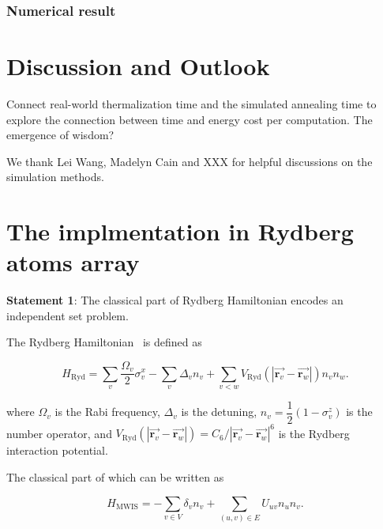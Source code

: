 \documentclass[twocolumn,superscriptaddress,english,showpacs,longbibliography]{revtex4-2}
\begin{document}
\subsubsection{Numerical result}\label{numerical-result-1}

\section{Discussion and Outlook}
Connect real-world thermalization time and the simulated annealing time to explore the connection between time and energy cost per computation.
The emergence of wisdom?

\begin{acknowledgments}
    We thank Lei Wang, Madelyn Cain and XXX for helpful discussions on the simulation methods.
\end{acknowledgments}

%


\appendix

\section{The implmentation in Rydberg atoms array}\label{physical-model-rydberg-atoms-array}

\textbf{Statement 1}: The classical part of Rydberg Hamiltonian encodes
an independent set problem.

The Rydberg Hamiltonian~\cite{Nguyen2023} is defined as

\begin{equation}
    H_{\text{Ryd}} = \sum_v \dfrac{\Omega_v}{2} \sigma^x_v -\sum_v \Delta_v n_v + \sum_{v < w}  V_{\text{Ryd}}(|\overrightarrow{\mathbf{r}_v} -\overrightarrow{\mathbf{r}_w}|)n_v n_w.
\end{equation}

where $\Omega_v$ is the Rabi frequency, $\Delta_v$ is the detuning,
$n_v = \dfrac{1}{2}(1 - \sigma^z_v)$ is the number operator, and
$V_{\text{Ryd}}(|\overrightarrow{\mathbf{r}_v} - \overrightarrow{\mathbf{r}_w}|) = C_6/|\overrightarrow{\mathbf{r}_v} - \overrightarrow{\mathbf{r}_w}|^6$
is the Rydberg interaction potential.

The classical part of which can be written as

\begin{equation}
H_{\text{MWIS}} = -\sum_{v \in V}\delta_v n_v + \sum_{(u, v) \in E} U_{uv} n_u n_v.
\end{equation}
\end{document}
